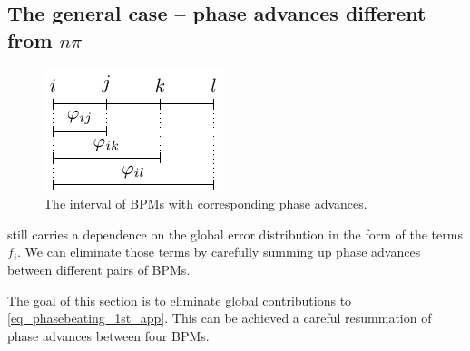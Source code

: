 \subsection{The general case -- phase advances different from \texorpdfstring{$n\pi$}{n*pi}}
\label{sec_generalcase}
%
\begin{figure}[htbp]
  \centering
    \includegraphics[width=.3\linewidth]{figIntervPhiIj}
  \caption{The interval of BPMs with corresponding phase advances.}
  \label{fig_interv_phi_ij}
\end{figure}
%
 still carries a dependence on the global error distribution in the form
of the terms $f_i$. We can eliminate those terms by carefully summing up phase advances between
different pairs of BPMs.


\label{sec_resummation}
The goal of this section is to eliminate global contributions to \eqref{eq_phasebeating_1st_app}.
This can be achieved a careful resummation of phase advances between four BPMs.

